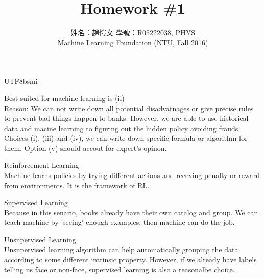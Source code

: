 \documentclass[12pt]{article}
\newenvironment{prob}[2][Prob.]{\begin{trivlist}
\item[\hskip \labelsep {\bfseries #1}\hskip \labelsep {\bfseries #2}]}{\end{trivlist}}
\begin{document}
\begin{CJK}{UTF8}{bsmi}
 
 
 
\title{Homework \#1}%
\author{姓名：趙愷文 學號：R05222038, PHYS\\ %
Machine Learning Foundation (NTU, Fall 2016)} %
 
\maketitle
 
\begin{prob}{1} Best suited for machine learning is (ii)\\
Reason: We can not write down all potential disadvatnages or give precise rules to prevent bad things happen to banks. However, we are able to use historical data and macine learning to figuring out the hidden policy avoiding frauds. Choices (i), (iii) and (iv), we can write down specific formula or algorithm for them. Option (v) should accout for expert's opinon.
\end{prob}

\begin{prob}{2} Reinforcement Learning \\
Machine learns policies by trying different actions and receving penalty or reward from environments. It is the framework of RL.
\end{prob}

\begin{prob}{3} Supervised Learning \\
Because in this senario, books already have their own catalog and group. We can teach machine by 'seeing' enough examples, then machine can do the job.
\end{prob}

\begin{prob}{4} Unsupervised Learning \\
Unsupervised learning algorithm can help automatically grouping the data according to some different intrinsic property. However, if we already have labels telling us face or non-face, supervised learning is also a reasonalbe choice.
\end{prob}


\end{CJK}
\end{document}

